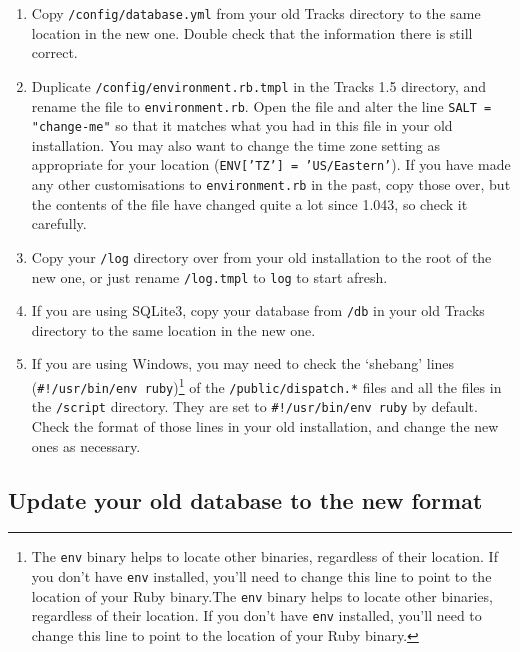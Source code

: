 \documentclass[10pt,twoside]{memoir}
\begin{document}
\begin{enumerate}


\item Copy \texttt{/config/database.yml} from your old Tracks directory to the same location in the new one. Double check that the information there is still correct.

\item Duplicate \texttt{/config/environment.rb.tmpl} in the Tracks 1.5 directory, and rename the file to \texttt{environment.rb}. Open the file and alter the line \texttt{SALT = "change-me"} so that it matches what you had in this file in your old installation. You may also want to change the time zone setting as appropriate for your location (\texttt{ENV['TZ'] = 'US/Eastern'}). If you have made any other customisations to \texttt{environment.rb} in the past, copy those over, but the contents of the file have changed quite a lot since 1.043, so check it carefully.

\item Copy your \texttt{/log} directory over from your old installation to the root of the new one, or just rename \texttt{/log.tmpl} to \texttt{log} to start afresh.

\item If you are using SQLite3, copy your database from \texttt{/db} in your old Tracks directory to the same location in the new one.

\item If you are using Windows, you may need to check the `shebang' lines (\texttt{\#!/usr/bin/env ruby})\footnote{The \texttt{env} binary helps to locate other binaries, regardless of their location. If you don't have \texttt{env} installed, you'll need to change this line to point to the location of your Ruby binary.The \texttt{env} binary helps to locate other binaries, regardless of their location. If you don't have \texttt{env} installed, you'll need to change this line to point to the location of your Ruby binary.} of the \texttt{/public/dispatch.*} files and all the files in the \texttt{/script} directory. They are set to \texttt{\#!/usr/bin/env ruby} by default. Check the format of those lines in your old installation, and change the new ones as necessary.
\end{enumerate}

\subsection{Update your old database to the new format}
\label{rake_upgrade}
\end{document}
